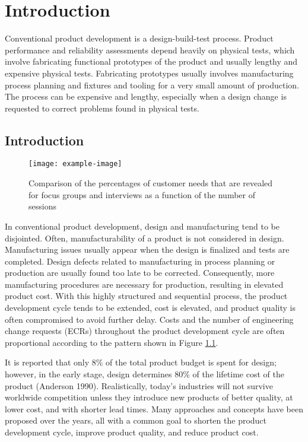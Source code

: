 \chapter{Introduction}

Conventional product development is a design-build-test process.
Product performance and reliability assessments depend heavily on physical tests,
which involve fabricating functional prototypes of the product and usually lengthy and expensive physical tests.
Fabricating prototypes usually involves manufacturing process planning and fixtures and tooling
for a very small amount of production.
The process can be expensive and lengthy,
especially when a design change is requested to correct problems found in physical tests.

\section{Introduction}

\begin{figure}[htbp]
  \centering
  \texttt{[image: example-image]}
  \caption{Comparison of the percentages of customer needs that are revealed for focus groups and interviews as a function of the number of sessions}\label{fig:a}
\end{figure}

In conventional product development, design and manufacturing tend to be disjointed.
Often, manufacturability of a product is not considered in design.
Manufacturing issues usually appear when the design is finalized and tests are completed.
Design defects related to manufacturing in process planning or production
are usually found too late to be corrected. Consequently, more manufacturing
procedures are necessary for production, resulting in elevated product cost\cite{cite1}.
With this highly structured and sequential process, the product development cycle tends
to be extended, cost is elevated, and product quality is often compromised to
avoid further delay. Costs and the number of engineering change requests (ECRs)
throughout the product development cycle are often proportional according to the pattern
shown in Figure \ref{fig:a}.

It is reported that only 8\% of the total product budget is spent for design; however, in
the early stage, design determines 80\% of the lifetime cost of the product (Anderson 1990).
Realistically, today's industries will not survive worldwide competition unless they introduce
new products of better quality, at lower cost, and with shorter lead times. Many approaches
and concepts have been proposed over the years, all with a common goal to shorten
the product development cycle, improve product quality, and reduce product cost\parencite{cite2}.


